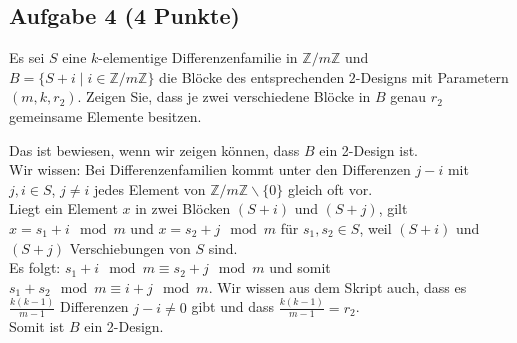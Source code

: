 \documentclass{article} %
\begin{document}
\subsection*{Aufgabe 4 (4 Punkte)}
Es sei $S$ eine $k$-elementige Differenzenfamilie in $\mathbb{Z}/m\mathbb{Z}$ und $B = \{S + i \mid i \in \mathbb{Z}/m\mathbb{Z}\}$ die Blöcke des entsprechenden $2$-Designs mit Parametern $(m, k, r_2)$. Zeigen Sie, dass je zwei verschiedene Blöcke in $B$ genau $r_2$ gemeinsame Elemente besitzen.
\begin{mybox}
Das ist bewiesen, wenn wir zeigen können, dass $B$ ein 2-Design ist. \\
Wir wissen: Bei Differenzenfamilien kommt unter den Differenzen $j-i$ mit $j, i \in S$, $j \neq i$ jedes Element von $\mathbb{Z}/m\mathbb{Z} \backslash \{0\}$
gleich oft vor. \\
Liegt ein Element $x$ in zwei Blöcken $(S+i)$ und $(S+j)$, gilt $x=s_1 +i \mod m$ und  $x=s_2 +j \mod m$ für $s_1, s_2 \in S$, weil $(S+i)$ und $(S+j)$ Verschiebungen von $S$ sind. \\
Es folgt: $s_1+i \mod m \equiv s_2 + j \mod m$ und somit $s_1+ s_2 \mod m \equiv i  + j \mod m$. Wir wissen aus dem Skript auch, dass es $\frac{k(k-1)}{m-1}$ Differenzen $j-i \neq 0$ gibt und dass $\frac{k(k-1)}{m-1} = r_2$. \\
Somit ist $B$ ein 2-Design. 
\end{mybox}
\end{document}
